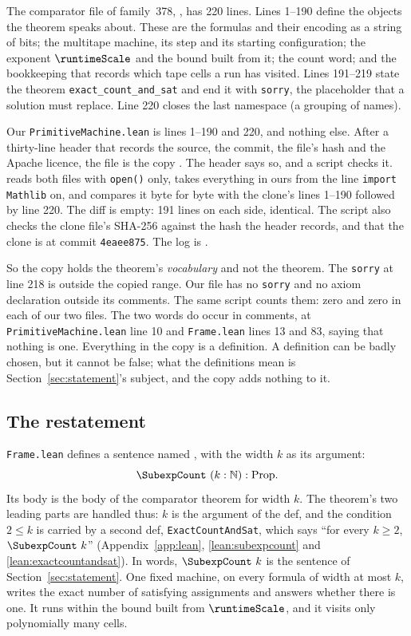 The comparator file of family~378,
, has 220
lines. Lines 1--190 define the objects the theorem speaks about. These are the
formulas and their encoding as a string of bits; the multitape machine, its
step and its starting configuration; the exponent $\runtimeScale$ and
the bound built from it; the count word; and the bookkeeping that
records which tape cells a run has visited. Lines 191--219 state the
theorem \texttt{exact\_count\_and\_sat} and end it with \texttt{sorry},
the placeholder that a solution must replace. Line 220 closes the last namespace (a grouping of names).

Our \texttt{PrimitiveMachine.lean} is lines 1--190 and 220, and nothing
else. After a thirty-line header that records the source, the commit,
the file's hash and the Apache licence, the file is the copy
. The header says so, and a script checks it.
 reads both files with
\texttt{open()} only, takes everything in ours from the line
\texttt{import Mathlib} on, and compares it byte for byte with the
clone's lines 1--190 followed by line 220. The diff is empty: 191 lines
on each side, identical. The script also checks the clone file's
SHA-256 against the hash the header records, and that the clone is at
commit \texttt{4eaee875}. The log is .

So the copy holds the theorem's \emph{vocabulary} and not the theorem.
The \texttt{sorry} at line 218 is outside the copied range. Our file
has no \texttt{sorry} and no axiom declaration outside its comments. The
same script counts them: zero and zero in each of our two files. The two
words do occur in comments, at \texttt{PrimitiveMachine.lean} line 10 and
\texttt{Frame.lean} lines 13 and 83, saying that nothing is one. Everything in the
copy is a definition. A definition can be badly chosen, but it cannot be
false; what the definitions mean is Section~\ref{sec:statement}'s
subject, and the copy adds nothing to it.

\subsection{The restatement}
\label{sec:lean-restatement}

\texttt{Frame.lean} defines a sentence named \SubexpCount{}, with the
width $k$ as its argument:
\[
  \SubexpCount\ (k : \mathbb{N}) : \mathrm{Prop}.
\]
Its body is the body of the comparator theorem for width $k$. The
theorem's two leading parts are handled thus: $k$ is the argument of the
def, and the condition $2 \le k$ is carried by a second def,
\texttt{ExactCountAndSat}, which says ``for every $k \ge 2$,
\(\SubexpCount\ k\)'' (Appendix~\ref{app:lean}, \ref{lean:subexpcount}
and \ref{lean:exactcountandsat}). In words, \(\SubexpCount\ k\) is the
sentence of Section~\ref{sec:statement}. One fixed machine, on every
formula of width at most $k$, writes the exact number of satisfying
assignments and answers whether there is one. It runs within the bound built
from $\runtimeScale$, and it visits only polynomially many cells.

